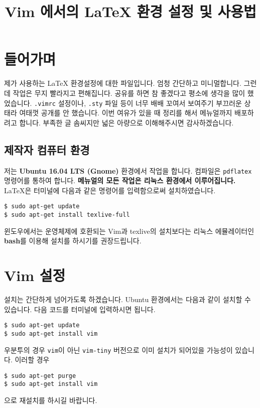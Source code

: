 \documentclass[a4paper, 10pt]{article}
\title{Vim 에서의 LaTeX 환경 설정 및 사용법}
\author{}
\date{}
\begin{document}
\maketitle

\section{들어가며}
제가 사용하는 LaTeX 환경설정에 대한 파일입니다. 엄청 간단하고 미니멀합니다.
그런데 작업은 무지 빨라지고 편해집니다. 공유를 하면 참 좋겠다고 평소에 생각을 많이
했었습니다. \texttt{.vimrc} 설정이나, \texttt{.sty} 파일 등이 너무 배배 꼬여서 보여주기
부끄러운 상태라 여태껏 공개를 안 했습니다. 이번 여유가 있을 때 정리를 해서 메뉴얼까지
배포하려고 합니다. 부족한 글 솜씨지만 넓은 아량으로 이해해주시면 감사하겠습니다.


\subsection*{제작자 컴퓨터 환경}
저는 \textbf{Ubuntu 16.04 LTS (Gnome)} 환경에서 작업을 합니다. 컴파일은
\texttt{pdflatex} 명령어를 통하여 합니다. \textbf{메뉴얼의 모든 작업은 리눅스 환경에서
이루어집니다.} LaTeX은 터미널에 다음과 같은 명령어를 입력함으로써 설치하였습니다.
\begin{Verbatim}[tabsize=4,xleftmargin=2em]
$ sudo apt-get update
$ sudo apt-get install texlive-full
\end{Verbatim}

윈도우에서는 운영체제에 호환되는 Vim과 texlive의 설치보다는 리눅스 에뮬레이터인
\textbf{bash}를 이용해 설치를 하시기를 권장드립니다.



\section{Vim 설정}
설치는 간단하게 넘어가도록 하겠습니다. Ubuntu 환경에서는 다음과 같이 설치할 수 있습니다.
다음 코드를 터미널에 입력하시면 됩니다.
\begin{Verbatim}[tabsize=4,xleftmargin=2em]
$ sudo apt-get update
$ sudo apt-get install vim
\end{Verbatim}

우분투의 경우 \texttt{vim}이 아닌 \texttt{vim-tiny} 버전으로 이미 설치가 되어있을 가능성이
있습니다. 이러할 경우
\begin{Verbatim}[tabsize=4,xleftmargin=2em]
$ sudo apt-get purge
$ sudo apt-get install vim
\end{Verbatim}
으로 재설치를 하시길 바랍니다.
\end{document}
